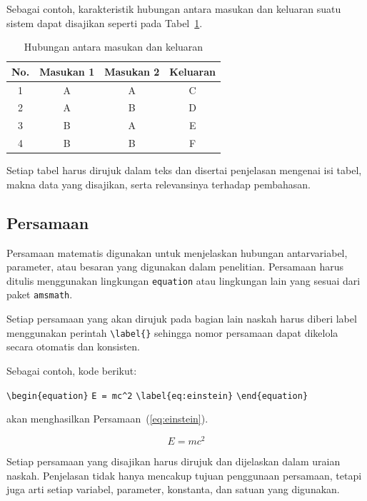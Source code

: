 Sebagai contoh, karakteristik hubungan antara masukan dan keluaran suatu sistem dapat disajikan seperti pada Tabel~\ref{tab:hubungan}.

\begin{table}[!ht]
\centering
\caption{Hubungan antara masukan dan keluaran}
\label{tab:hubungan}
\begin{tabular}{|c|c|c|c|}
\hline
No. & Masukan 1 & Masukan 2 & Keluaran \\
\hline
1 & A & A & C \\
2 & A & B & D \\
3 & B & A & E \\
4 & B & B & F \\
\hline
\end{tabular}
\end{table}

Setiap tabel harus dirujuk dalam teks dan disertai penjelasan mengenai isi tabel, makna data yang disajikan, serta relevansinya terhadap pembahasan.

\subsection{Persamaan}

Persamaan matematis digunakan untuk menjelaskan hubungan antarvariabel, parameter, atau besaran yang digunakan dalam penelitian. Persamaan harus ditulis menggunakan lingkungan \texttt{equation} atau lingkungan lain yang sesuai dari paket \texttt{amsmath}.

Setiap persamaan yang akan dirujuk pada bagian lain naskah harus diberi label menggunakan perintah \verb|\label{}| sehingga nomor persamaan dapat dikelola secara otomatis dan konsisten.

Sebagai contoh, kode berikut:

\begin{tcolorbox}
\verb|\begin{equation}|
\verb|E = mc^2|
\verb|\label{eq:einstein}|
\verb|\end{equation}|
\end{tcolorbox}

akan menghasilkan Persamaan~(\ref{eq:einstein}).

\begin{equation}
E = mc^2
\label{eq:einstein}
\end{equation}

Setiap persamaan yang disajikan harus dirujuk dan dijelaskan dalam uraian naskah. Penjelasan tidak hanya mencakup tujuan penggunaan persamaan, tetapi juga arti setiap variabel, parameter, konstanta, dan satuan yang digunakan.

